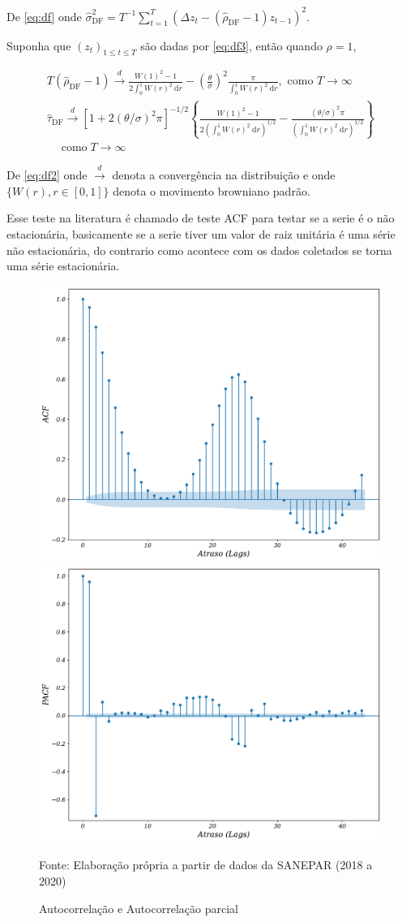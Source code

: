 De \eqref{eq:df} onde $\hat{\sigma}_{\mathrm{DF}}^2=T^{-1} \sum_{t=1}^T\left(\Delta z_t-\left(\hat{\rho}_{\mathrm{DF}}-1\right) z_{t-1}\right)^2 .$



Suponha que $\left(z_t\right)_{1 \leq t \leq T}$ são dadas por \eqref{eq:df3}, então quando $\rho=1$,


\begin{eqnarray}
	T\left(\hat{\rho}_{\mathrm{DF}}-1\right) \stackrel{d}{\longrightarrow} \frac{W(1)^2-1}{2 \int_0^1 W(r)^2 \mathrm{~d} r}-\left(\frac{\theta}{\sigma}\right)^2 \frac{\pi}{\int_0^1 W(r)^2 \mathrm{~d} r}, \text { como } T \rightarrow \infty \\
	\hat{\tau}_{\mathrm{DF}} \stackrel{d}{\longrightarrow}\left[1+2(\theta / \sigma)^2 \pi\right]^{-1 / 2}\left\{\frac{W(1)^2-1}{2\left(\int_0^1 W(r)^2 \mathrm{~d} r\right)^{1 / 2}}-\frac{(\theta / \sigma)^2 \pi}{\left(\int_0^1 W(r)^2 \mathrm{~d} r\right)^{1 / 2}}\right\} \\
	\quad \operatorname{como} T \rightarrow \infty\label{eq:df2}
\end{eqnarray}


De \eqref{eq:df2} onde $\stackrel{d}{\longrightarrow}$ denota a convergência na distribuição e onde $\{W(r), r \in[0,1]\}$ denota o movimento browniano padrão.

Esse teste na literatura é chamado de teste ACF para testar se a serie é o não estacionária, basicamente se a serie tiver um valor de raiz unitária é uma série não estacionária, do contrario como acontece com os dados coletados se torna uma série estacionária.


\begin{figure}[H]
	\centering
		\caption{Autocorrelação e Autocorrelação parcial}
\begin{minipage}[c]{\textwidth}
	\label{fig:acf}
	\includegraphics[width=0.5\linewidth]{Resultados/Figuras/acf} \qquad
	\includegraphics[width=0.5\linewidth]{Resultados/Figuras/pacf}
\end{minipage}
	Fonte: Elaboração própria a partir de dados da SANEPAR (2018 a 2020)
\end{figure}

